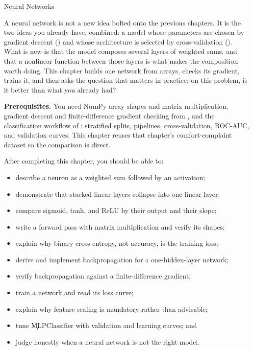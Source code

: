 
\h{Neural Networks}
\label{ch:21}

A neural network is not a new idea bolted onto the previous chapters. It is the
two ideas you already have, combined: a model whose parameters are chosen by
gradient descent () and whose architecture is
selected by cross-validation (). What is new is that
the model composes several layers of weighted sums, and that a nonlinear
function between those layers is what makes the composition worth doing. This
chapter builds one network from arrays, checks its gradient, trains it, and then
asks the question that matters in practice: on this problem, is it better than
what you already had?

\begin{NoteBox}
\textbf{Prerequisites.} You need NumPy array shapes and matrix multiplication,
gradient descent and finite-difference gradient checking from
, and the classification workflow of
: stratified splits, pipelines, cross-validation,
ROC-AUC, and validation curves. This chapter reuses that chapter's
comfort-complaint dataset so the comparison is direct.
\end{NoteBox}

\begin{tcolorbox}[title=Learning outcomes,colframe=orange,colback=white,arc=2mm]
After completing this chapter, you should be able to:
\begin{itemize}
    \item describe a neuron as a weighted sum followed by an activation;
    \item demonstrate that stacked linear layers collapse into one linear layer;
    \item compare sigmoid, tanh, and ReLU by their output and their slope;
    \item write a forward pass with matrix multiplication and verify its shapes;
    \item explain why binary cross-entropy, not accuracy, is the training loss;
    \item derive and implement backpropagation for a one-hidden-layer network;
    \item verify backpropagation against a finite-difference gradient;
    \item train a network and read its loss curve;
    \item explain why feature scaling is mandatory rather than advisable;
    \item tune \c{MLPClassifier} with validation and learning curves; and
    \item judge honestly when a neural network is not the right model.
\end{itemize}
\end{tcolorbox}

